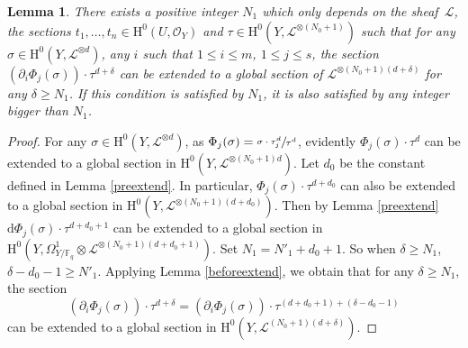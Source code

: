 \documentclass[11pt]{article}
\numberwithin{equation}{section}
\theoremstyle{plain}
\newtheorem{lem}[thm]{Lemma}
\theoremstyle{definition}
\newcommand{\ho}{\mathrm{H}}
\newcommand{\li}{\mathcal{L}}
\newcommand{\F}{\mathbb{F}}
\begin{document}
\begin{lem}\label{extend}
There exists a positive integer $N_1$ which only depends on the sheaf~$\li$, the sections $t_1,\dots, t_n\in \ho^0(U, \mathcal{O}_Y)$ and $\tau\in \ho^0(Y, \li^{\otimes (N_0+1)})$ such that for any $\sigma \in \ho^0(Y, \li^{\otimes d})$, any $i$ such that $1\leq i\leq m$, $1\leq j\leq s$, the section $\left(\partial_i \Phi_j(\sigma) \right)\cdot \tau^{d+\delta}$ can be extended to a global section of $\li^{\otimes (N_0+1)(d+\delta)}$ for any $\delta \geq N_1$. If this condition is satisfied by $N_1$, it is also satisfied by any integer bigger than $N_1$.
\end{lem}
\begin{proof}[Proof]
For any $\sigma \in \ho^0(Y, \li^{\otimes d})$, as $\Phi_j(\sigma)=\sfrac{\sigma \cdot \tau_j^d}{\tau^d}$, evidently $\Phi_j(\sigma)\cdot \tau^d$ can be extended to a global section in $\ho^0(Y, \li^{\otimes (N_0+1)d})$. Let $d_0$ be the constant defined in Lemma \ref{preextend}. In particular, $\Phi_j(\sigma)\cdot \tau^{d+d_0}$ can also be extended to a global section in $\ho^0(Y, \li^{\otimes (N_0+1)(d+d_0)})$. Then by Lemma \ref{preextend} $\mathrm{d}\Phi_j(\sigma)\cdot \tau^{d+d_0+1}$ can be extended to a global section in $\ho^0(Y, \Omega_{Y/\F_q}^1\otimes \li^{\otimes (N_0+1)(d+d_0+1)})$.
Set $N_1=N'_1+d_0+1$. So when $\delta\geq N_1$, $\delta-d_0-1\geq N'_1$. Applying Lemma \ref{beforeextend}, we obtain that for any $\delta\geq N_1$, the section\vspace*{-3pt}
\[
\left(\partial_i \Phi_j(\sigma) \right)\cdot \tau^{d+\delta}=\left(\partial_i \Phi_j(\sigma) \right)\cdot \tau^{(d+d_0+1)+(\delta-d_0-1)}
\]
can be extended to a global section in $\ho^0(Y, \li^{(N_0+1)(d+\delta)})$.
\end{proof}
\end{document}
